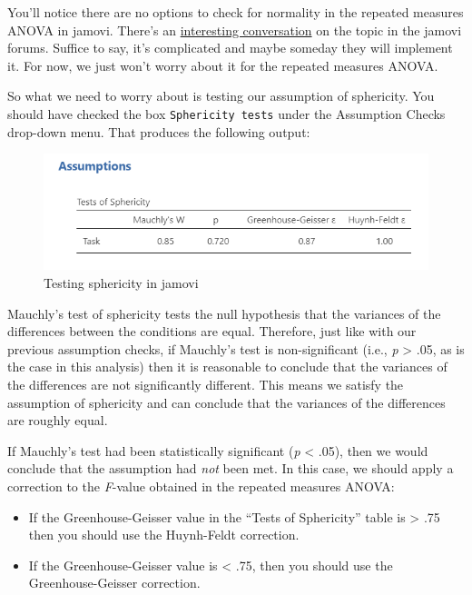 \documentclass[
]{book}
\providecommand{\tightlist}{%
  \setlength{\itemsep}{0pt}\setlength{\parskip}{0pt}}
\begin{document}
You'll notice there are no options to check for normality in the repeated measures ANOVA in jamovi. There's an \href{https://forum.jamovi.org/viewtopic.php?f=5\&t=1045}{interesting conversation} on the topic in the jamovi forums. Suffice to say, it's complicated and maybe someday they will implement it. For now, we just won't worry about it for the repeated measures ANOVA.

So what we need to worry about is testing our assumption of sphericity. You should have checked the box \texttt{Sphericity\ tests} under the Assumption Checks drop-down menu. That produces the following output:

\begin{figure}

{\centering \includegraphics[width=1\linewidth]{images/05-repeated-measures-anova/rm-anova_sphericity} 

}

\caption{Testing sphericity in jamovi}\label{fig:unnamed-chunk-6}
\end{figure}

Mauchly's test of sphericity tests the null hypothesis that the variances of the differences between the conditions are equal. Therefore, just like with our previous assumption checks, if Mauchly's test is non-significant (i.e., \emph{p} \textgreater{} .05, as is the case in this analysis) then it is reasonable to conclude that the variances of the differences are not significantly different. This means we satisfy the assumption of sphericity and can conclude that the variances of the differences are roughly equal.

If Mauchly's test had been statistically significant (\emph{p} \textless{} .05), then we would conclude that the assumption had \emph{not} been met. In this case, we should apply a correction to the \emph{F}-value obtained in the repeated measures ANOVA:

\begin{itemize}
\tightlist
\item
  If the Greenhouse-Geisser value in the ``Tests of Sphericity'' table is \textgreater{} .75 then you should use the Huynh-Feldt correction.
\item
  If the Greenhouse-Geisser value is \textless{} .75, then you should use the Greenhouse-Geisser correction.
\end{itemize}
\end{document}
